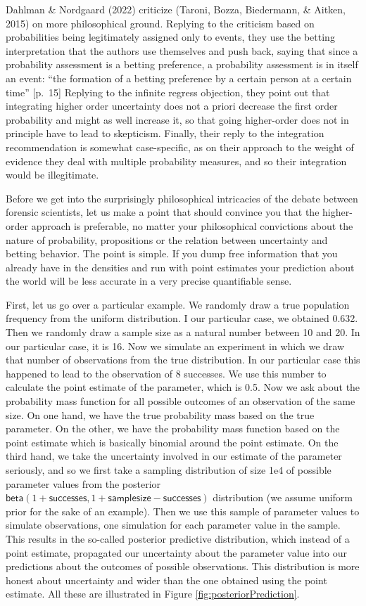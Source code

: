 \documentclass[
  10pt,
  dvipsnames,enabledeprecatedfontcommands]{scrartcl}
\newcommand{\s}[1]{\mbox{$\mathsf{#1}$}}
\begin{document}
Dahlman \& Nordgaard (2022) criticize (Taroni, Bozza, Biedermann, \&
Aitken, 2015) on more philosophical ground. Replying to the criticism
based on probabilities being legitimately assigned only to events, they
use the betting interpretation that the authors use themselves and push
back, saying that since a probability assessment is a betting
preference, a probability assessment is in itself an event: ``the
formation of a betting preference by a certain person at a certain
time'' {[}p.~15{]} Replying to the infinite regress objection, they
point out that integrating higher order uncertainty does not a priori
decrease the first order probability and might as well increase it, so
that going higher-order does not in principle have to lead to
skepticism. Finally, their reply to the integration recommendation is
somewhat case-specific, as on their approach to the weight of evidence
they deal with multiple probability measures, and so their integration
would be illegitimate.

Before we get into the surprisingly philosophical intricacies of the
debate between forensic scientists, let us make a point that should
convince you that the higher-order approach is preferable, no matter
your philosophical convictions about the nature of probability,
propositions or the relation between uncertainty and betting behavior.
The point is simple. If you dump free information that you already have
in the densities and run with point estimates your prediction about the
world will be less accurate in a very precise quantifiable sense.

First, let us go over a particular example. We randomly draw a true
population frequency from the uniform distribution. I our particular
case, we obtained 0.632. Then we randomly draw a sample size as a
natural number between 10 and 20. In our particular case, it is 16. Now
we simulate an experiment in which we draw that number of observations
from the true distribution. In our particular case this happened to lead
to the observation of 8 successes. We use this number to calculate the
point estimate of the parameter, which is 0.5. Now we ask about the
probability mass function for all possible outcomes of an observation of
the same size. On one hand, we have the true probability mass based on
the true parameter. On the other, we have the probability mass function
based on the point estimate which is basically binomial around the point
estimate. On the third hand, we take the uncertainty involved in our
estimate of the parameter seriously, and so we first take a sampling
distribution of size 1e4 of possible parameter values from the posterior
\(\s{beta}(1+\s{successes}, 1+\s{sample size} - \s{successes})\)
distribution (we assume uniform prior for the sake of an example). Then
we use this sample of parameter values to simulate observations, one
simulation for each parameter value in the sample. This results in the
so-called posterior predictive distribution, which instead of a point
estimate, propagated our uncertainty about the parameter value into our
predictions about the outcomes of possible observations. This
distribution is more honest about uncertainty and wider than the one
obtained using the point estimate. All these are illustrated in Figure
\ref{fig:posteriorPrediction}.
\end{document}
